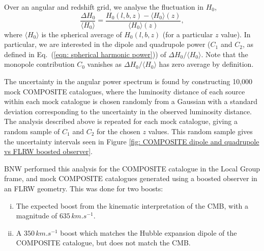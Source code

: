 \documentclass[a4paper,12pt]{report}
\renewcommand{\eqref}[1]{Eq.~({#1})}
\begin{document}
Over an angular and redshift grid, we analyse the fluctuation in $H_0$,
\begin{equation}
  \frac{\Delta H_0}{\langle H_0 \rangle} = \frac{H_0(l,b,z) - \langle H_0 \rangle(z)}{\langle H_0 \rangle(z)},
\end{equation}
where $\langle H_0 \rangle$ is the spherical average of $H_0(l,b,z)$ (for a particular $z$ value). In particular, we are interested in the dipole and quadrupole power ($C_1$ and $C_2$, as defined in \eqref{\ref{eqn: spherical harmonic power}}) of $\Delta H_0/\langle H_0 \rangle$. Note that the monopole contribution $C_0$ vanishes as $\Delta H_0/\langle H_0 \rangle$ has zero average by definition.

The uncertainty in the angular power spectrum is found by constructing 10,000 mock COMPOSITE catalogues, where the luminosity distance of each source within each mock catalogue is chosen randomly from a Gaussian with a standard deviation corresponding to the uncertainty in the observed luminosity distance. The analysis described above is repeated for each mock catalogue, giving a random sample of $C_1$ and $C_2$ for the chosen $z$ values. This random sample gives the uncertainty intervals seen in Figure \ref{fig: COMPOSITE dipole and quadrupole vs FLRW boosted observer}.

BNW \cite{RN3} performed this analysis for the COMPOSITE catalogue in the Local Group frame, and mock COMPOSITE catalogues generated using a boosted observer in an FLRW geometry. This was done for two boosts:

\begin{enumerate}[(i)]
  \item The expected boost from the kinematic interpretation of the CMB, with a magnitude of $635\, \si{km.s^{-1}}$.
  \item A $350\, \si{km.s^{-1}}$ boost which matches the Hubble expansion dipole of the COMPOSITE catalogue, but does not match the CMB.
\end{enumerate}
\end{document}
